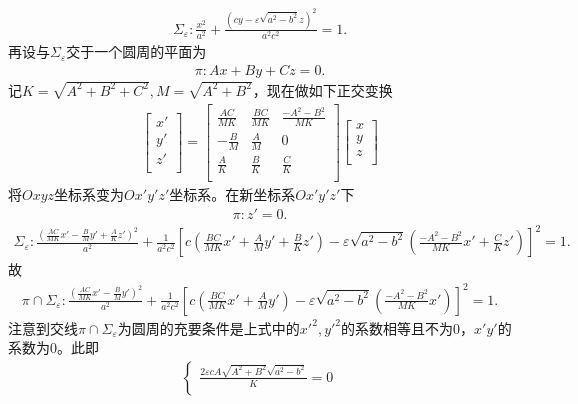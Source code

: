 \documentclass[../../main.tex]{subfiles}%
\begin{document}
\begin{solution}
\begin{align*}
\Sigma_\varepsilon:\frac{x^2}{a^2}+\frac{(cy-\varepsilon \sqrt{a^2-b^2}z)^2}{a^2c^2}=1.
\end{align*}
再设与$\Sigma_\varepsilon$交于一个圆周的平面为
\begin{align*}
\pi:Ax+By+Cz=0.
\end{align*}
记$K=\sqrt{A^2+B^2+C^2},M=\sqrt{A^2+B^2}$，现在做如下正交变换
\begin{align*}
\left[ \begin{array}{c}
x'\\
y'\\
z'\\
\end{array} \right] =\left[ \begin{matrix}
\frac{AC}{MK}&		\frac{BC}{MK}&		\frac{-A^2-B^2}{MK}\\
-\frac{B}{M}&		\frac{A}{M}&		0\\
\frac{A}{K}&		\frac{B}{K}&		\frac{C}{K}\\
\end{matrix} \right] \left[ \begin{array}{c}
x\\
y\\
z\\
\end{array} \right] 
\end{align*}
将$Oxyz$坐标系变为$Ox'y'z'$坐标系。在新坐标系$Ox'y'z'$下
\begin{align*}
\pi:z'=0.
\end{align*}
\begin{align*}
\Sigma _{\varepsilon}:\frac{\left( \frac{AC}{MK}x' -\frac{B}{M}y' +\frac{A}{K}z' \right) ^2}{a^2}+\frac{1}{a^2c^2}\left[ c\left( \frac{BC}{MK}x' +\frac{A}{M}y' +\frac{B}{K}z' \right) -\varepsilon \sqrt{a^2-b^2}\left( \frac{-A^2-B^2}{MK}x' +\frac{C}{K}z' \right) \right] ^2=1.
\end{align*}
故
\begin{align*}
\pi \cap \Sigma _{\varepsilon}:\frac{\left( \frac{AC}{MK}x' -\frac{B}{M}y' \right) ^2}{a^2}+\frac{1}{a^2c^2}\left[ c\left( \frac{BC}{MK}x' +\frac{A}{M}y' \right) -\varepsilon \sqrt{a^2-b^2}\left( \frac{-A^2-B^2}{MK}x' \right) \right] ^2=1.
\end{align*}
注意到交线$\pi \cap \Sigma_\varepsilon$为圆周的充要条件是上式中的$x'^2,y'^2$的系数相等且不为$0$，$x'y'$的系数为$0$。此即
\begin{align*}
\begin{cases}
\frac{2\varepsilon cA\sqrt{A^2+B^2}\sqrt{a^2-b^2}}{K}=0\\

\end{cases}
\end{align*}
\end{solution}
\end{document}
